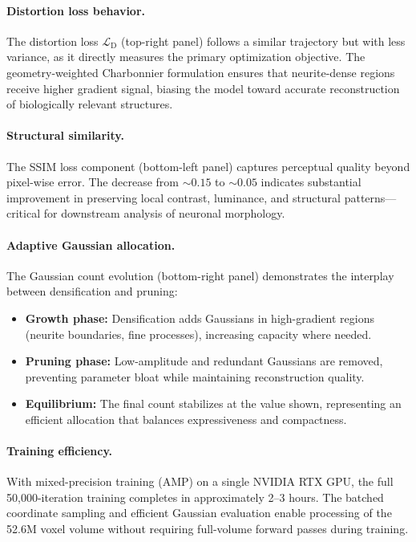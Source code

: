 \documentclass[11pt,a4paper]{article}
\begin{document}
\paragraph{Distortion loss behavior.}
The distortion loss $\mathcal{L}_{\mathrm{D}}$ (top-right panel) follows a similar trajectory but with less variance, as it directly measures the primary optimization objective. The geometry-weighted Charbonnier formulation ensures that neurite-dense regions receive higher gradient signal, biasing the model toward accurate reconstruction of biologically relevant structures.

\paragraph{Structural similarity.}
The SSIM loss component (bottom-left panel) captures perceptual quality beyond pixel-wise error. The decrease from $\sim 0.15$ to $\sim 0.05$ indicates substantial improvement in preserving local contrast, luminance, and structural patterns---critical for downstream analysis of neuronal morphology.

\paragraph{Adaptive Gaussian allocation.}
The Gaussian count evolution (bottom-right panel) demonstrates the interplay between densification and pruning:
\begin{itemize}
    \item \textbf{Growth phase:} Densification adds Gaussians in high-gradient regions (neurite boundaries, fine processes), increasing capacity where needed.
    \item \textbf{Pruning phase:} Low-amplitude and redundant Gaussians are removed, preventing parameter bloat while maintaining reconstruction quality.
    \item \textbf{Equilibrium:} The final count stabilizes at the value shown, representing an efficient allocation that balances expressiveness and compactness.
\end{itemize}

\paragraph{Training efficiency.}
With mixed-precision training (AMP) on a single NVIDIA RTX GPU, the full 50,000-iteration training completes in approximately 2--3 hours. The batched coordinate sampling and efficient Gaussian evaluation enable processing of the 52.6M voxel volume without requiring full-volume forward passes during training.
\end{document}
